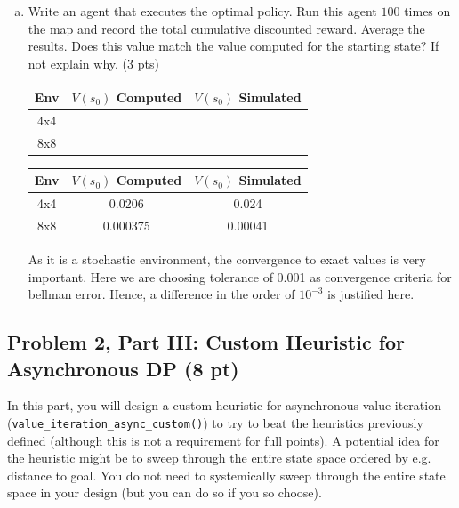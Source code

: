 \documentclass[12pt]{article}
\begin{document}
\begin{enumerate}[a)]
\item Write an agent that executes the optimal policy. Run this agent $100$ times on the map and record the total cumulative discounted reward. Average the results. Does this value match the value computed for the starting state? If not explain why. (3 pts)
  
\begin{center}
  \begin{tabular}{|c|c|c|}\hline
    {\bf Env} & {\bf $V(s_0)$ Computed} & {\bf $V(s_0)$ Simulated}  \\ \hline
    4x4  &  &  \\ \hline
    8x8  &  &  \\ \hline
  \end{tabular}
\end{center}

\begin{solution}
\begin{center}
  \begin{tabular}{|c|c|c|}\hline
    {\bf Env} & {\bf $V(s_0)$ Computed} & {\bf $V(s_0)$ Simulated}  \\ \hline
    4x4  &  0.0206 &  0.024 \\ \hline
    8x8  &  0.000375 &  0.00041 \\ \hline
  \end{tabular}
\end{center}
As it is a stochastic environment, the convergence to exact values is very important. Here we are choosing tolerance of 0.001 as convergence criteria for bellman error. Hence, a difference in the order of $10^{-3}$ is justified here.
\end{solution}
  
\end{enumerate}


\subsection*{Problem 2, Part III: Custom Heuristic for Asynchronous DP (8 pt)}

In this part, you will design a custom heuristic for asynchronous value iteration\\
(\texttt{value\_iteration\_async\_custom()}) to try to beat the heuristics previously defined (although this is not a requirement for full points). A potential idea for the heuristic might be to sweep through the entire state space ordered by e.g. distance to goal. You do not need to systemically sweep through the entire state space in your design (but you can do so if you so choose).
\end{document}
